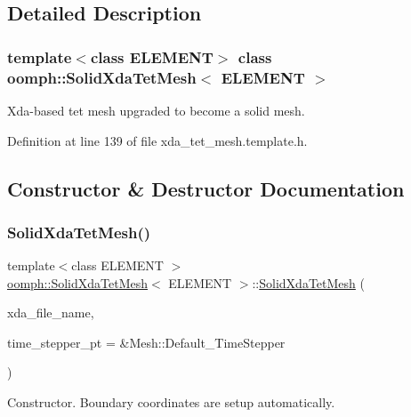 \subsection{Detailed Description}
\subsubsection*{template$<$class E\+L\+E\+M\+E\+NT$>$\newline
class oomph\+::\+Solid\+Xda\+Tet\+Mesh$<$ E\+L\+E\+M\+E\+N\+T $>$}

Xda-\/based tet mesh upgraded to become a solid mesh. 

Definition at line 139 of file xda\+\_\+tet\+\_\+mesh.\+template.\+h.



\subsection{Constructor \& Destructor Documentation}
\mbox{\label{classoomph_1_1SolidXdaTetMesh_a1242b23a2df9f424ec17aa2059ba116d}} 
\subsubsection{\texorpdfstring{Solid\+Xda\+Tet\+Mesh()}{SolidXdaTetMesh()}}
{\footnotesize\ttfamily template$<$class E\+L\+E\+M\+E\+NT $>$ \\
\hyperlink{classoomph_1_1SolidXdaTetMesh}{oomph\+::\+Solid\+Xda\+Tet\+Mesh}$<$ E\+L\+E\+M\+E\+NT $>$\+::\hyperlink{classoomph_1_1SolidXdaTetMesh}{Solid\+Xda\+Tet\+Mesh} (\begin{DoxyParamCaption}\item[{const std\+::string}]{xda\+\_\+file\+\_\+name,  }\item[{Time\+Stepper $\ast$}]{time\+\_\+stepper\+\_\+pt = {\ttfamily \&Mesh\+:\+:Default\+\_\+TimeStepper} }\end{DoxyParamCaption})\hspace{0.3cm}{\ttfamily [inline]}}



Constructor. Boundary coordinates are setup automatically. 



